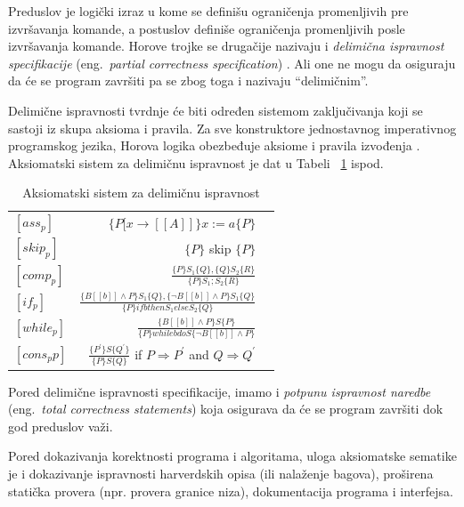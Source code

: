 \documentclass[a4paper]{article}
\begin{document}
{Preduslov je logički izraz u kome se definišu ograničenja promenljivih pre izvršavanja komande, a postuslov definiše ograničenja promenljivih posle izvršavanja komande.
Horove trojke se drugačije nazivaju i \textit{delimična ispravnost specifikacije } (eng.~{\em  partial correctness specification}) .
Ali one ne mogu da osiguraju da će se program završiti pa se zbog toga i nazivaju “delimičnim”.

Delimične ispravnosti tvrdnje će biti određen sistemom zaključivanja koji se sastoji iz skupa aksioma i pravila. Za sve konstruktore jednostavnog imperativnog programskog jezika, Horova logika obezbeđuje aksiome i pravila izvođenja \cite{milena}. Aksiomatski sistem za delimičnu ispravnost je dat u Tabeli ~\ref{tab:a} ispod.

\begin{table}[h]
    \begin{center}
        \begin{tabular}{lrc}\hline
        \hline
        \hline
        $[ass_{p}] $ & $ \{ P[x \rightarrow [\![A]\!]\} x:= a \{P\}$    \\  [6pt]
        $[skip_{p}] $ & $ \{P\}$ skip  $ \{P\}$   \\ [6pt]
         $[comp_{p}] $ & $  \frac{\{P\}S_1\{Q\},\{Q\}S_2\{R\}}{\{P\}S_1;S_2\{R\}} $ \\[6pt]
            $[if_{p}] $ & $  \frac{\{B[\![b]\!]\land P\}S_1\{Q\},\{\neg B[\![b]\!]\land P\}S_1\{Q\}}{\{P\} if b then S_1 else S_2\{Q\}} $ \\ [6pt]
        $[while_{p}] $ & $  \frac{\{B[\![b]\!]\land P\}S\{P\}}{\{P\} while b do S \{\neg B[\![b]\!]\land P\}} $ \\ [6pt]
          $[cons_p{p}] $ & $  \frac{\{P^{'}\}S\{Q^{'}\}}{\{P\}S\{Q\}} $ if $ P \Rightarrow	 P^{'} $ and $ Q \Rightarrow	 Q^{'} $  \\ [6pt]
          \hline \hline
        \end{tabular}
        \caption{Aksiomatski sistem za delimičnu ispravnost}\label{tab:a}
    \end{center}
\end{table}






Pored delimične ispravnosti specifikacije, imamo i \textit {potpunu ispravnost naredbe } (eng.~{\em  total correctness statements}) koja osigurava da će se program završiti dok god preduslov važi.

Pored dokazivanja korektnosti programa i algoritama, uloga aksiomatske sematike je i dokazivanje ispravnosti harverdskih opisa (ili nalaženje bagova), proširena statička provera (npr. provera granice niza), dokumentacija programa i interfejsa.

}
\end{document}
